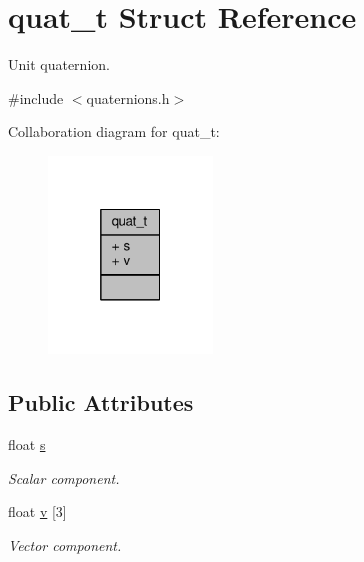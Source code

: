 \hypertarget{structquat__t}{\section{quat\+\_\+t Struct Reference}
\label{structquat__t}
}


Unit quaternion.  




{\ttfamily \#include $<$quaternions.\+h$>$}



Collaboration diagram for quat\+\_\+t\+:
\nopagebreak
\begin{figure}[H]
\begin{center}
\leavevmode
\includegraphics[width=124pt]{structquat__t__coll__graph}
\end{center}
\end{figure}
\subsection*{Public Attributes}
\begin{DoxyCompactItemize}
\item 
\hypertarget{structquat__t_afe90b186a2072976bf84ab00f8bfd479}{float \hyperlink{structquat__t_afe90b186a2072976bf84ab00f8bfd479}{s}}\label{structquat__t_afe90b186a2072976bf84ab00f8bfd479}

\begin{DoxyCompactList}\small\item\em Scalar component. \end{DoxyCompactList}\item 
\hypertarget{structquat__t_add14cbdf5ed1984b100136c819e1cdf7}{float \hyperlink{structquat__t_add14cbdf5ed1984b100136c819e1cdf7}{v} \mbox{[}3\mbox{]}}\label{structquat__t_add14cbdf5ed1984b100136c819e1cdf7}

\begin{DoxyCompactList}\small\item\em Vector component. \end{DoxyCompactList}\end{DoxyCompactItemize}


